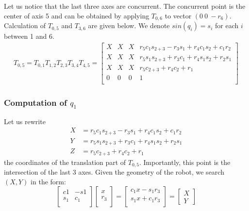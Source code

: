 \documentclass{article}
\begin{document}
Let us notice that the last three axes are concurrent. The concurrent point is the center of axis 5 and can be obtained by applying $T_{0,6}$ to vector $\left(0\ 0\ -r_6\right)$.
Calculation of  $T_{0,5}$ and $T_{3,6}$ are given below. We denote $sin(q_i)=s_i$  for each $i$ between 1 and 6.
\begin{align*}
T_{0,5} = T_{0,1} T_{1,2} T_{2,3} T_{3,4} T_{4,5} =
\begin{bmatrix}
  X & X & X &r_5c_1s_{2+3}-r_3s_1+r_4c_1s_2+c_1r_2\\
  X & X & X & r_5s_1s_{2+3}+r_3c_1+r_4s_1s_2+r_2s_1 \\
  X & X & X & r_5c_{2+3}+r_4c_2+r_1 \\
  0 & 0 & 0 & 1 \\
\end{bmatrix}
\end{align*}

\subsubsection*{Computation of $q_1$}

Let us rewrite
\begin{align*}
  X&=r_5c_1s_{2+3}-r_3s_1+r_4c_1s_2+c_1r_2\\
  Y&=r_5s_1s_{2+3}+r_3c_1+r_4s_1s_2+r_2s_1\\
  Z&=r_5c_{2+3}+r_4c_2+r_1
\end{align*}
the coordinates of the translation part of $T_{0,5}$. Importantly, this point is the intersection of the last 3 axes.
Given the geometry of the robot, we search $(X,Y)$ in the form:
\begin{equation}\label{eq:XY}
  \begin{bmatrix}
    c1 & -s1\\
    s_1 & c_1\\
  \end{bmatrix}
  \begin{bmatrix}
    x\\
    r_3\\
  \end{bmatrix}
  =
  \begin{bmatrix}
    c_1x-s_1r_3\\
    s_1x+c_1r_3\\
  \end{bmatrix}
  =
  \begin{bmatrix}
    X\\Y
  \end{bmatrix}
\end{equation}
\end{document}
